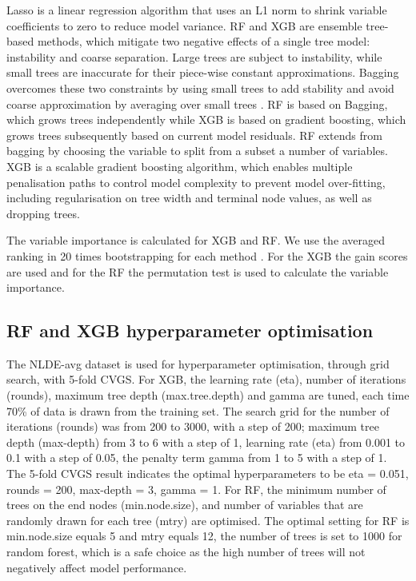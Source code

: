\documentclass{article}
\begin{document}
Lasso is a linear regression algorithm that uses an L1 norm to shrink variable coefficients to zero to reduce model variance. RF and XGB are ensemble tree-based methods, which mitigate two negative effects of a single tree model: instability and coarse separation. Large trees are subject to instability, while small trees are inaccurate for their piece-wise constant approximations. Bagging overcomes these two constraints by using small trees to add stability and avoid coarse approximation by averaging over small trees \citep{friedman2001greedy}. RF is based on Bagging, which grows trees independently while XGB is based on gradient boosting, which grows trees subsequently based on current model residuals. RF extends from bagging by choosing the variable to split from a subset a number of variables. XGB is a scalable gradient boosting algorithm, which enables multiple penalisation paths to control model complexity to prevent model over-fitting, including regularisation on tree width and terminal node values, as well as dropping trees.  

The variable importance is calculated for XGB and RF. We use the averaged ranking in 20 times bootstrapping for each method \citep{luglobal}. For the XGB the gain scores \citep{chen2016xgboost} are used and for the RF the permutation test is used to calculate the variable importance. 

\subsection{RF and XGB hyperparameter optimisation}

The NLDE-avg dataset is used for hyperparameter optimisation, through grid search, with 5-fold CVGS. For XGB, the learning rate (eta), number of iterations (rounds), maximum tree depth (max.tree.depth) and gamma are tuned, each time 70\% of data is drawn from the training set. The search grid for the number of iterations (rounds) was from 200 to 3000, with a step of 200; maximum tree depth (max-depth) from 3 to 6 with a step of 1, learning rate (eta) from 0.001 to 0.1 with a step of 0.05, the penalty term gamma \citep{xgboost} from 1 to 5 with a step of 1. The 5-fold CVGS result indicates the optimal hyperparameters to be eta = 0.051, rounds = 200, max-depth = 3, gamma = 1. For RF, the minimum number of trees on the end nodes (min.node.size), and number of variables that are randomly drawn for each tree (mtry) are optimised. The optimal setting for RF is min.node.size equals 5 and mtry equals 12, the number of trees is set to 1000 for random forest, which is a safe choice as the high number of trees will not negatively affect model performance.
 
\end{document}
